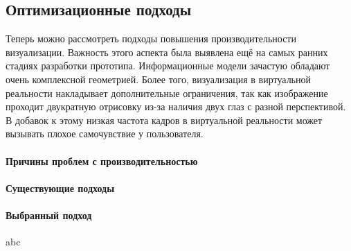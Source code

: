 ﻿\subsection{Оптимизационные подходы}

Теперь можно рассмотреть подходы повышения производительности визуализации.
Важность этого аспекта была выявлена 
ещё на самых ранних стадиях разработки прототипа.
Информационные модели зачастую обладают очень комплексной геометрией.
Более того, визуализация в виртуальной реальности накладывает
дополнительные ограничения, так как изображение проходит двукратную отрисовку
из-за наличия двух глаз с разной перспективой.
В добавок к этому низкая частота кадров в виртуальной реальности
может вызывать плохое самочувствие у пользователя.
\cite{Weech2019}

\paragraph{Причины проблем с производительностью}


\paragraph{Существующие подходы}


\paragraph{Выбранный подход}

abc

